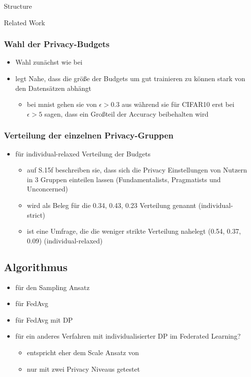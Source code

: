 \begin{chapter}{Structure}
\begin{section}{Related Work}
		\subsubsection{Wahl der Privacy-Budgets}
		\begin{itemize}
			\item Wahl zunächst wie bei \cite{boenisch:2023}
			\item \cite{sun:2021} legt Nahe, dass die größe der Budgets um gut trainieren zu können stark von den Datensätzen abhängt
			\begin{itemize}
				\item bei mnist gehen sie von $\epsilon > 0.3$ aus während sie für CIFAR10 erst bei $\epsilon > 5$ sagen, dass ein Großteil der Accuracy beibehalten wird
			\end{itemize}
		\end{itemize}
		\subsubsection{Verteilung der einzelnen Privacy-Gruppen}
		\begin{itemize}
			\item \cite{alaggan:2016} für individual-relaxed Verteilung der Budgets
				\begin{itemize}
					\item auf S.15f beschreiben sie, dass sich die Privacy Einstellungen von Nutzern in 3 Gruppen einteilen lassen (Fundamentalists, Pragmatists und Unconcerned)
					\item \cite{jensen:2005} wird als Beleg für die 0.34, 0.43, 0.23 Verteilung genannt (individual-strict)
					\item \cite{acquisti:2005} ist eine Umfrage, die die weniger strikte Verteilung nahelegt (0.54, 0.37, 0.09) (individual-relaxed)
				\end{itemize}
		\end{itemize}
		
		\subsection{Algorithmus}
		\begin{itemize}
			\item \cite{boenisch:2023} für den Sampling Ansatz
			\item \cite{mcmahan:2016} für FedAvg
			\item \cite{mcmahan:2018} für FedAvg mit DP
			\item \cite{aldaghri:2023} für ein anderes Verfahren mit individualisierter DP im Federated Learning?
			\begin{itemize}
				\item entspricht eher dem Scale Ansatz von \cite{boenisch:2023}
				\item nur mit zwei \glqq{}Privacy Niveaus\grqq{} getestet
			\end{itemize}
		\end{itemize}
		

\end{section}
\end{chapter}
